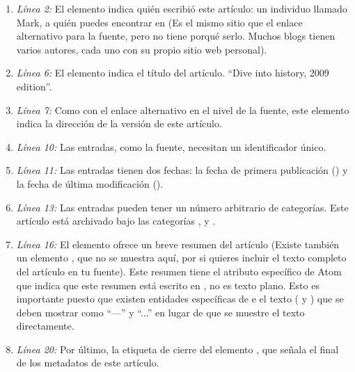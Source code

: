 \begin{enumerate}

\item \emph{Línea 2:} El elemento  indica quién escribió este artículo: un individuo llamado Mark, a quién puedes encontrar en  (Es el mismo sitio que el enlace alternativo para la fuente, pero no tiene porqué serlo. Muchos blogs tienen varios autores, cada uno con su propio sitio web personal).

\item \emph{Línea 6:} El elemento  indica el título del artículo. ``Dive into history, 2009 edition''.

\item \emph{Línea 7:} Como con el enlace alternativo en el nivel de la fuente, este elemento  indica la dirección de la versión  de este artículo.

\item \emph{Línea 10:} Las entradas, como la fuente, necesitan un identificador único.

\item \emph{Línea 11:} Las entradas tienen dos fechas: la fecha de primera publicación () y la fecha de última modificación ().

\item \emph{Línea 13:} Las entradas pueden tener un número arbitrario de categorías. Este artículo está archivado bajo las categorías ,  y .

\item \emph{Línea 16:} El elemento  ofrece un breve resumen del artículo (Existe también un elemento , que no se muestra aquí, por si quieres incluir el texto completo del artículo en tu fuente). Este resumen tiene el atributo específico de Atom  que indica que este resumen está escrito en , no es texto plano. Esto es importante puesto que existen entidades específicas de  e el texto ( y ) que se deben mostrar como ``---'' y ``...'' en lugar de que se muestre el texto directamente.

\item \emph{Línea 20:} Por último, la etiqueta de cierre del elemento , que señala el final de los metadatos de este artículo. 

\end{enumerate}

